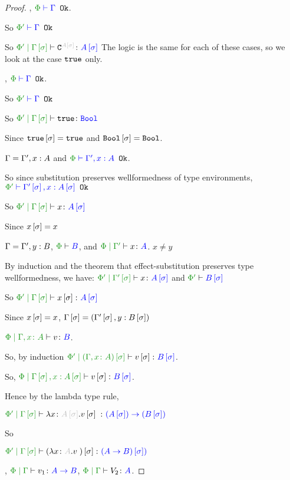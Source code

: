 \documentclass{report}
\begin{document}
\begin{framed}
    \begin{proof}
        
    \bi, $\wellformedok{\P}{\G}$.
    
    So $\wellformedok{\P'}{\G}$
    
    So $\etyperelation{\P'}{\G\ssi}{\const{A\ssi}}{A\ssi}$
    The logic is the same for each of these cases, so we look at the case $\texttt{true}$ only.
    
    \bi, $\wellformedok{\P}{\G}$.
    
    So $\wellformedok{\P'}{\G}$
    
    So $\etyperelation{\P'}{\G\ssi}{\t}{\B}$
    
    Since $\texttt{true}\left[\sigma\right]=\texttt{true}$ and $\texttt{Bool}\left[\sigma\right]=\texttt{Bool}$.
    
    \bi $\Gamma = \Gamma', x:A$ and $\wellformedok{\P}{\G', x:A}$.
    
    So since substitution preserves wellformedness of type environments, $\wellformedok{\P'}{\G'\ssi, x:A\ssi}$
    
    So $\etyperelation{\P'}{\G\ssi}{x}{A\ssi}$
    
    Since $x\left[\sigma\right] = x$
    
    \bi $\Gamma = \Gamma', y:B$, $\wellformed{\P}{B}$, and $\etyperelation{\P}{\G'}{x}{A}$. $x \neq y$
    
    By induction and the theorem that effect-substitution preserves type wellformedness, we have: $\etyperelation{\P'}{\G'\ssi}{x}{A\ssi}$ and $\wellformed{\P'}{B\ssi}$
    
    So $\etyperelation{\P'}{\G\ssi}{x\ssi}{A\ssi}$
    
    Since $x\left[\sigma\right] = x$, $\Gamma\left[\sigma\right] = (\Gamma'\left[\sigma\right], y:B\left[\sigma\right])$
    
    
    \bi $\etyperelation{\P}{\gax}{v}{B}$.
    
    So, by induction $\etyperelation{\P'}{(\gax)\ssi}{v\ssi}{B\ssi}$.
    
    So, $\etyperelation{\P}{\G\ssi, x:A\ssi}{v\ssi}{B\ssi}$.
    
    Hence by the lambda type rule,
    
    $\etyperelation{\P'}{\G\ssi}{\lam{x}{A\ssi}{v\ssi}}{\fntype{(A\ssi)}{(B\ssi)}}$
    
    So
    
    $\etyperelation{\P'}{\G\ssi}{(\lam{x}{A}{v})\ssi}{(\ab)\ssi)}$
    
    \bi, $\gpetyperelation{v_1}{\ab}$, $\gpetyperelation{V_2}{A}$.
    

\end{proof}
\end{framed}
\end{document}
